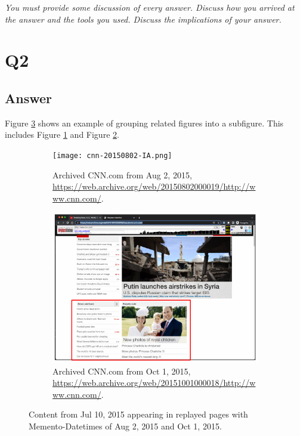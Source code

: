 \documentclass[12pt]{article}
\begin{document}
\emph{You must provide some discussion of every answer. Discuss how you arrived at the answer and the tools you used. Discuss the implications of your answer.}

\section*{Q2}

\subsection*{Answer}

Figure \ref{fig:subfigure-ex} shows an example of grouping related figures into a subfigure.  This includes Figure \ref{fig:cnn-2015aug02} and Figure \ref{fig:cnn-2015oct01}.
\begin{figure}[ht]
\centering
\begin{subfigure}{0.45\textwidth}
  \centering
  \texttt{[image: cnn-20150802-IA.png]}
  \caption{Archived CNN.com from Aug 2, 2015, \url{https://web.archive.org/web/20150802000019/http://www.cnn.com/}.}
\label{fig:cnn-2015aug02}
\end{subfigure}
\hspace{20pt}
\begin{subfigure}{0.45\textwidth}
  \centering
  \includegraphics[width=0.9\linewidth]{cnn-20151001-IA.png}
  \caption{Archived CNN.com from Oct 1, 2015, \url{https://web.archive.org/web/20151001000018/http://www.cnn.com/}.}
\label{fig:cnn-2015oct01}
\end{subfigure}%
\caption{Content from Jul 10, 2015 appearing in replayed pages with Memento-Datetimes of Aug 2, 2015 and Oct 1, 2015.}
\label{fig:subfigure-ex}
\end{figure}
\end{document}
